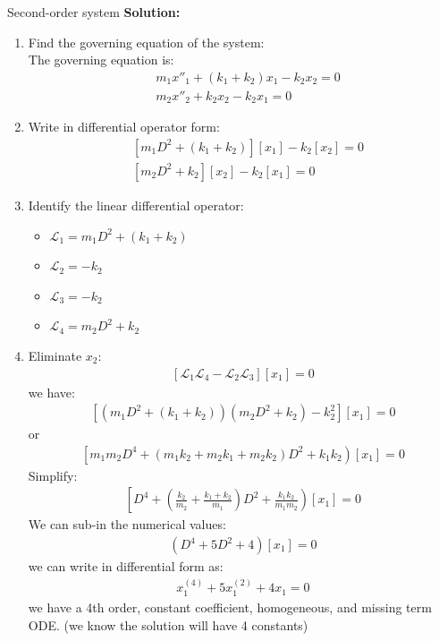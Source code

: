 \begin{exmp}{Second-order system}
\textbf{Solution:}\\
\begin{enumerate}
\item Find the governing equation of the system:\\
The governing equation is:
 \begin{align*}
&m_1x''_1 +\left(k_1+k_2\right)x_1-k_2x_2 = 0\\
&m_2x''_2 +k_2x_2- k_2x_1= 0
\end{align*}
\item Write in differential operator form:
 \begin{align*}
&\left[m_1D^2 +\left(k_1+k_2\right)\right][x_1]-k_2[x_2] = 0\\
&\left[m_2D^2 +k_2\right][x_2]- k_2[x_1]= 0
\end{align*}
\item Identify the linear differential operator:
\begin{itemize}
\item $\mathcal{L}_1=m_1D^2 +\left(k_1+k_2\right)$
\item $\mathcal{L}_2=-k_2$
\item $\mathcal{L}_3=-k_2$
\item $\mathcal{L}_4=m_2D^2 +k_2$
\end{itemize}
\item Eliminate $x_2$:
 \begin{align*}
\left[\mathcal{L}_1\mathcal{L}_4-\mathcal{L}_2\mathcal{L}_3\right][x_1]=0
\end{align*}
we have:
 \begin{align*}
\left[\left(m_1D^2 +\left(k_1+k_2\right)\right)\left(m_2D^2 +k_2\right)-k^2_2\right][x_1]=0
\end{align*}
or
 \begin{align*}
\left[m_1m_2D^4+(m_1k_2+m_2k_1+m_2k_2)D^2+k_1k_2\right)[x_1]=0
\end{align*}
Simplify:
 \begin{align*}
\left[D^4+(\frac{k_2}{m_2}+\frac{k_1+k_2}{m_1})D^2+\frac{k_1k_2}{m_1m_2}\right)[x_1]=0
\end{align*}
We can sub-in the numerical values:
 \begin{align*}
\left(D^4+5D^2 +4\right)[x_1]=0
\end{align*}
we can write in differential form as:
 \begin{align*}
x_1^{(4)}+5x_1^{(2)}+4x_1=0
\end{align*}
we have a 4th order, constant coefficient, homogeneous, and missing term ODE. (we know the solution will have 4 constants)\\


\end{enumerate}
\end{exmp}

